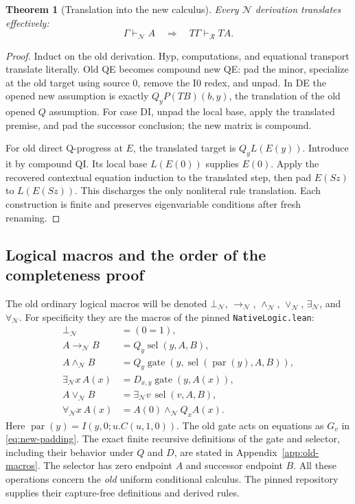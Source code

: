 \documentclass[11pt,a4paper]{article}
\newtheorem{theorem}{Theorem}[section]
\theoremstyle{definition}
\begin{document}
\begin{theorem}[Translation into the new calculus]
\label{thm:new-T}
Every $\mathcal N$ derivation translates effectively:
\[
 \Gamma\vdash_{\mathcal N}A
 \quad\Longrightarrow\quad
 T\Gamma\vdash_{\mathcal R}TA.
\]
\end{theorem}
\begin{proof}
Induct on the old derivation.  Hyp, computations, and equational transport
translate literally.  Old QE becomes compound new QE: pad the minor,
specialize at the old target using source $0$, remove the I0 redex, and
unpad.  In DE the opened new assumption is exactly
$Q_yP(TB)(b,y)$, the translation of the old opened $Q$ assumption.
For case DI, unpad the local base, apply the translated premise, and pad
the successor conclusion; the new matrix is compound.

For old direct Q-progress at $E$, the translated target is $Q_yL(E(y))$.
Introduce it by compound QI.  Its local base $L(E(0))$ supplies $E(0)$.
Apply the recovered contextual equation induction to the translated step,
then pad $E(Sz)$ to $L(E(Sz))$.  This discharges the only nonliteral rule
translation.  Each construction is finite and preserves eigenvariable
conditions after fresh renaming.
\end{proof}

\subsection{Logical macros and the order of the completeness proof}
\label{subsec:new-image-logic}

The old ordinary logical macros will be denoted
$\bot_{\mathcal N}$, $\to_{\mathcal N}$, $\wedge_{\mathcal N}$,
$\vee_{\mathcal N}$, $\exists_{\mathcal N}$, and $\forall_{\mathcal N}$.
For specificity they are the macros of the pinned
\texttt{NativeLogic.lean}:\cite{native}
\begin{equation}
 \begin{aligned}
 \bot_{\mathcal N}&=(0=1),\\
 A\to_{\mathcal N}B&=Q_y\operatorname{sel}(y,A,B),\\
 A\wedge_{\mathcal N}B
   &=Q_y\operatorname{gate}
           (y,\operatorname{sel}(\operatorname{par}(y),A,B)),\\
 \exists_{\mathcal N}x\,A(x)&=D_{x,y}\operatorname{gate}(y,A(x)),\\
 A\vee_{\mathcal N}B&=\exists_{\mathcal N}v\,
                                   \operatorname{sel}(v,A,B),\\
 \forall_{\mathcal N}x\,A(x)&=A(0)\wedge_{\mathcal N}Q_xA(x).
 \end{aligned}
 \label{eq:new-old-macros}
\end{equation}
Here $\operatorname{par}(y)=I(y,0;u.C(u,1,0))$.
The old gate acts on equations as $G_v$ in \eqref{eq:new-padding}.
The exact finite recursive definitions of the gate and selector, including
their behavior under $Q$ and $D$, are stated in Appendix~\ref{app:old-macros}.
The selector has zero endpoint $A$ and successor endpoint $B$.
All these operations concern the \emph{old} uniform conditional calculus.
The pinned repository supplies their capture-free definitions and derived
rules.
\end{document}
